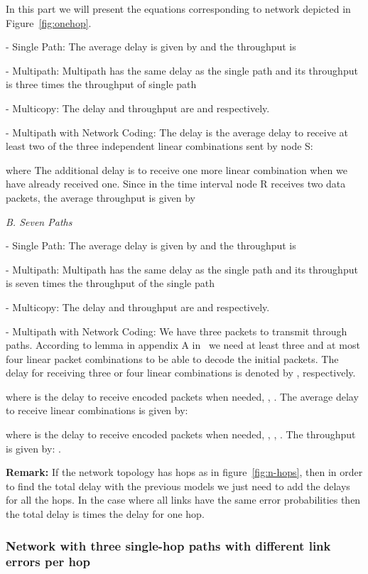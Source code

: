 \documentclass[journal, onecolumn, 12pt]{IEEEtran}
\begin{document}
In this part we will present the equations corresponding to network depicted in Figure~\ref{fig:onehop}.

- Single Path: The average delay is given by  and the throughput is 

- Multipath: Multipath has the same delay as the single path  and its throughput is three times the throughput of single path 

- Multicopy: The delay and throughput are  and  respectively.

- Multipath with Network Coding: The delay  is the average delay to receive at least two of the three independent linear combinations sent by node S:

where 
The additional delay  is to receive one more linear combination when we have already received one.
Since in the time interval  node R receives two data packets, the average throughput is given by 

\textit{B. Seven Paths}

- Single Path: The average delay is given by  and the throughput is 

- Multipath: Multipath has the same delay as the single path  and its throughput is seven times the throughput of the single path 

- Multicopy: The delay and throughput are  and  respectively.

- Multipath with Network Coding: We have three packets to transmit through  paths.
According to lemma in appendix A in~\cite{b:pathdivgain1} we need at least three and at most four linear packet combinations to be able to decode the initial packets.
The delay for receiving three or four linear combinations is denoted by , respectively.

where  is the delay to receive  encoded packets when  needed, , .
The average delay to receive  linear combinations is given by:

where  is the delay to receive  encoded packets when  needed, , , .
The throughput is given by:  .

\textbf{Remark:} If the network topology has  hops as in figure~\ref{fig:n-hops}, then in order to find the total delay with the previous models we just need to add the delays for all the hops.
In the case where all links have the same error probabilities then the total delay is  times the delay for one hop.

\subsubsection{Network with three single-hop paths with different link errors per hop}
\label{sec:diff_error_per_hop}
\end{document}
